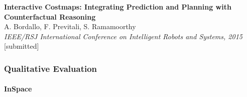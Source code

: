 \begin{frame}
	\vspace{-0.4cm}
	
	\begin{tabbing}
		\hspace{1.55cm}
		\textbf{Interactive Costmaps: Integrating Prediction and Planning with Counterfactual
				Reasoning} \\
		\hspace{1.55cm}
		A. Bordallo, F. Previtali, S. Ramamoorthy \\
		\hspace{1.55cm}
		\emph{IEEE/RSJ International Conference on Intelligent Robots and Systems, 2015} [submitted] \\
	\end{tabbing}
\end{frame}

\begin{frame}
	\frametitle{Qualitative Evaluation}
	\framesubtitle{InSpace}
	
	\begin{figure}[!h]
		\centering
	\end{figure}
\end{frame}

